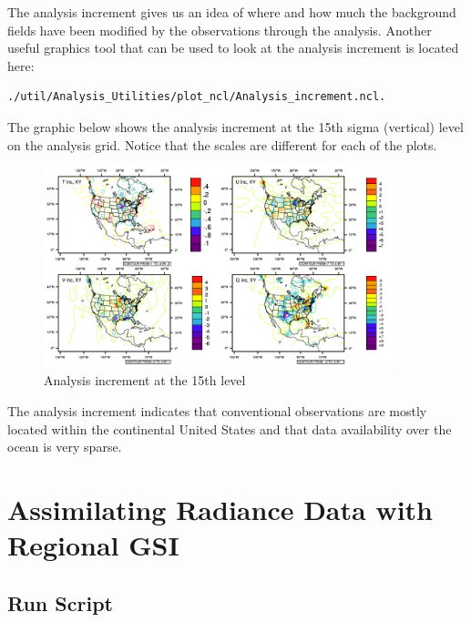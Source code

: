 The analysis increment gives us an idea of where and how much the background fields have been modified by the observations through the analysis.  Another useful graphics tool that can be used to look at the analysis increment is located here: 

\begin{scriptsize}
\begin{verbatim}
./util/Analysis_Utilities/plot_ncl/Analysis_increment.ncl.
\end{verbatim}
\end{scriptsize}  

The graphic below shows the analysis increment at the 15th sigma (vertical) level on the analysis grid. Notice that the scales are different for each of the plots. 

\begin{figure}[h!]
  \centering
  \includegraphics[width=0.9\textwidth]{images/increments}
  \caption{Analysis increment at the 15th level}
  \label{fig:increments}
\end{figure}

The analysis increment indicates that conventional observations are mostly located within the continental United States and that data availability over the ocean is very sparse. 

\section{Assimilating Radiance Data with Regional GSI}

\subsection{Run Script}
\label{sec5.2.1}

